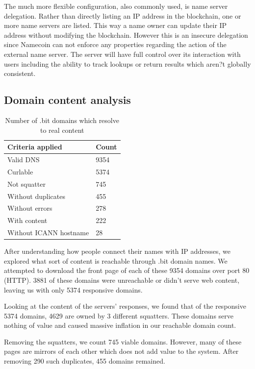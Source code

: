 The much more flexible configuration, also commonly used, is name server delegation. Rather than directly listing an IP address in the blockchain, one or more name servers are listed. This way a name owner can update their IP address without modifying the blockchain. However this is an insecure delegation since Namecoin can not enforce any properties regarding the action of the external name server. The server will have full control over its interaction with users including the ability to track lookups or return results which aren?t globally consistent.

\subsection{Domain content analysis}
\label{domainbreakdown}

\begin{table}[t]
\centering
\begin{tabular}{ll}
Criteria applied & Count \\ \hline
Valid DNS          &  9354  \\
Curlable        & 5374     \\
Not squatter        & 745     \\
Without duplicates      & 455     \\
Without errors              & 278    \\
With content              & 222    \\
Without ICANN hostname   & 28   \\
\end{tabular}
\caption{Number of .bit domains which resolve to real content}
\end{table}

After understanding how people connect their names with IP addresses, we explored what sort of content is reachable through .bit domain names. We attempted to download the front page of each of these 9354 domains over port 80 (HTTP). 3881 of these domains were unreachable or didn't serve web content, leaving us with only 5374 responsive domains.

Looking at the content of the servers' responses, we found that of the responsive 5374 domains, 4629 are owned by 3 different squatters. These domains serve nothing of value and caused massive inflation in our reachable domain count.

Removing the squatters, we count 745 viable domains. However, many of these pages are mirrors of each other which does not add value to the system. After removing 290 such duplicates, 455 domains remained.

